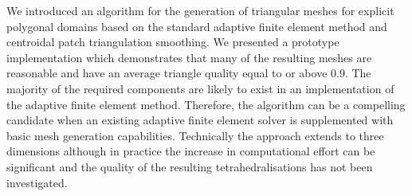 \documentclass[11pt]{article}
\begin{document}
We introduced an algorithm for the generation of triangular meshes for explicit
polygonal domains based on the standard adaptive finite element method and
centroidal patch triangulation smoothing.  We presented a prototype
implementation which demonstrates that many of the resulting
meshes are reasonable and have an average triangle quality equal to or above
0.9.
The majority of the required components are likely to exist in an
implementation of the adaptive finite element method.  Therefore, the algorithm
can be a compelling candidate when an existing adaptive finite element solver is
supplemented with basic mesh generation capabilities.
Technically the approach extends to three dimensions although in practice the
increase in computational effort can be significant and the quality of the
resulting tetrahedralisations has not been investigated.



\end{document}
